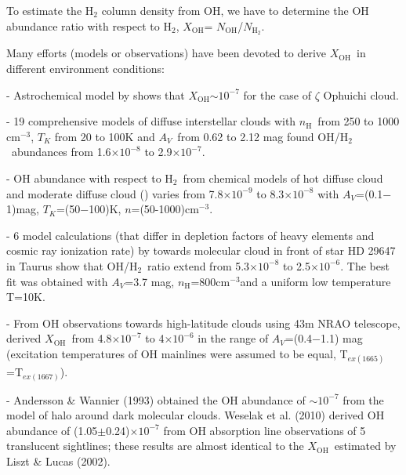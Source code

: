 \documentclass[preprint]{emulateapj}
\def\av{$A_{V}$}
\def\cc{cm$^{-3}$}
\def\h2{H$_2$}
\def\nh3{NH$_3$}
\def\NHm{$N_{\mathrm{H}_{2}}$}
\def\nh{$n_\mathrm{H}$}
\def\NOH{$N_\mathrm{OH}$}
\def\xoh{$X_\mathrm{OH}$}
\begin{document}
To estimate the \h2 column density from OH, we have to determine the OH abundance ratio with respect to \h2, \xoh= \NOH/\NHm. 

Many efforts (models or observations) have been devoted to derive \xoh\ in different environment conditions:


- Astrochemical model by \citet{Black1977} shows that \xoh$\sim$$10^{-7}$ for the case of $\zeta$ Ophuichi cloud.

- 19 comprehensive models of diffuse interstellar clouds with \nh\ from 250 to 1000 \cc, $T_{K}$ from 20 to 100K and \av\ from 0.62 to 2.12 mag \citet{vanDishoeck1986} found OH/\h2\ abundances from 1.6$\times$$10^{-8}$ to 2.9$\times$$10^{-7}$.

- OH abundance with respect to \h2\ from chemical models of hot diffuse cloud and moderate diffuse cloud (\citealt{Viala1986}) varies from 7.8$\times$$10^{-9}$ to 8.3$\times$$10^{-8}$ with \av=(0.1$-$1)mag, $T_{K}$=(50$-$100)K, $n$=(50-1000)\cc.

- 6 model calculations (that differ in depletion factors of heavy elements and cosmic ray ionization rate) by \citet{Nercessian1988} towards molecular cloud in front of star HD 29647 in Taurus show that OH/\h2\ ratio extend from 5.3$\times$$10^{-8}$ to 2.5$\times$$10^{-6}$. The best fit was obtained with \av=3.7 mag, \nh=800\cc and a uniform low temperature T=10K.

- From OH observations towards high-latitude clouds using 43m NRAO telescope, \citet{Magnani1988} derived \xoh\ from 4.8$\times$$10^{-7}$ to 4$\times$$10^{-6}$ in the range of \av=(0.4$-$1.1) mag (excitation temperatures of OH mainlines were assumed to be equal, T$_{ex(1665)}$=T$_{ex(1667)}$).

- Andersson \& Wannier (1993) obtained the OH abundance of $\sim$$10^{-7}$ from the model of halo around dark molecular clouds. Weselak et al. (2010) derived OH abundance of (1.05$\pm$0.24)$\times$$10^{-7}$ from OH absorption line observations of 5 translucent sightlines; these results are almost identical to the \xoh\ estimated by Liszt \& Lucas (2002).  
\end{document}
